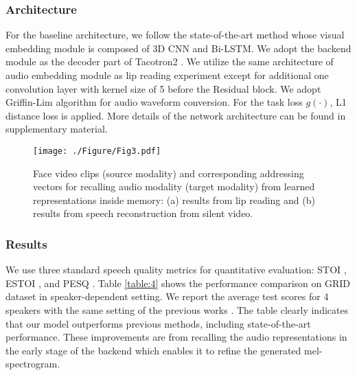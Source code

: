 \documentclass[10pt,twocolumn,letterpaper]{article}
\begin{document}
\vspace{-0.2cm}
\subsubsection{Architecture}
\vspace{-0.2cm}
For the baseline architecture, we follow the state-of-the-art method \cite{l2w} whose visual embedding module is composed of 3D CNN and Bi-LSTM. We adopt the backend module as the decoder part of Tacotron2 \cite{tacotron2}. We utilize the same architecture of audio embedding module as lip reading experiment except for additional one convolution layer with kernel size of 5 before the Residual block. We adopt Griffin-Lim \cite{griffinlim} algorithm for audio waveform conversion. For the task loss $g(\cdot)$, L1 distance loss is applied.
More details of the network architecture can be found in supplementary material.

\begin{figure*}[t!]
	\begin{minipage}[b]{1.0\linewidth}
		\centering
		\centerline{\texttt{[image: ./Figure/Fig3.pdf]}}
	\end{minipage}
	\caption{Face video clips (source modality) and corresponding addressing vectors for recalling audio modality (target modality) from learned representations inside memory: (a) results from lip reading and (b) results from speech reconstruction from silent video.}
	\label{fig:3}
	\vspace{-0.3cm}
\end{figure*}


\vspace{-0.2cm}
\subsubsection{Results}
\vspace{-0.2cm}
We use three standard speech quality metrics for quantitative evaluation: STOI \cite{stoi}, ESTOI \cite{estoi}, and PESQ \cite{pesq}. Table \ref{table:4} shows the performance comparison on GRID dataset in speaker-dependent setting. We report the average test scores for 4 speakers with the same setting of the previous works \cite{akbari2018lip2audspec, ganbased, ephrat2017improved, l2w, yadav2020speech}. The table clearly indicates that our model outperforms previous methods, including state-of-the-art performance. These improvements are from recalling the audio representations in the early stage of the backend which enables it to refine the generated mel-spectrogram.
\end{document}
